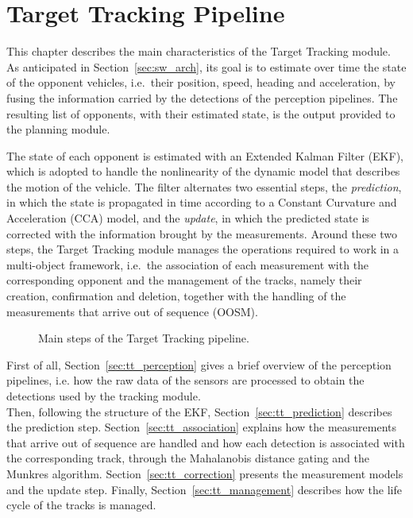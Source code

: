 
\chapter{Target Tracking Pipeline}
\label{ch:tracking}

This chapter describes the main characteristics of the Target Tracking module. As
anticipated in Section~\ref{sec:sw_arch}, its goal is to estimate over time the state of
the opponent vehicles, i.e.\ their position, speed, heading and acceleration, by fusing the
information carried by the detections of the perception pipelines. The resulting list of
opponents, with their estimated state, is the output provided to the planning module.

The state of each opponent is estimated with an Extended Kalman Filter (EKF), which is adopted
to handle the nonlinearity of the dynamic model that describes the motion of the vehicle. The
filter alternates two essential steps, the \emph{prediction}, in which the state is propagated
in time according to a Constant Curvature and Acceleration (CCA) model, and the
\emph{update}, in which the predicted state is corrected with the information brought by the
measurements. Around these two steps, the Target Tracking module manages the operations
required to work in a multi-object framework, i.e.\ the association of each measurement with
the corresponding opponent and the management of the tracks, namely their creation,
confirmation and deletion, together with the handling of the measurements that arrive out of
sequence (OOSM).

\begin{figure}[H]
    \centering
    \resizebox{\textwidth}{!}{}
    \caption{Main steps of the Target Tracking pipeline.}
    \label{fig:tt_pipeline}
\end{figure}

First of all, Section~\ref{sec:tt_perception} gives a brief overview of the perception pipelines, i.e.
how the raw data of the sensors are processed to obtain the detections used by the
tracking module. \\Then, following the structure of the EKF, Section~\ref{sec:tt_prediction}
describes the prediction step. Section~\ref{sec:tt_association} explains how the
measurements that arrive out of sequence are handled and how each detection is associated with the corresponding track, through the Mahalanobis distance gating and the
Munkres algorithm. Section~\ref{sec:tt_correction} presents the measurement models and the
update step.
Finally, Section~\ref{sec:tt_management} describes how the life cycle of the tracks is
managed.

